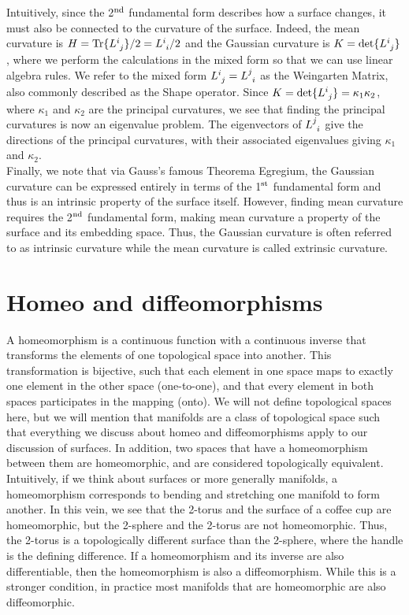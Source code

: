 \begin{appendices}
Intuitively, since the 2$^{\rm nd}$ fundamental form describes how a surface changes, it must also be connected to the curvature of the surface.
Indeed, the mean curvature is $H = \textrm{Tr}\{ \tensor{L}{^i_j} \}/2 = \tensor{L}{^i_i}/2$ and the Gaussian curvature is $K = \textrm{det}\{ \tensor{L}{^i_j} \}$, where we perform the calculations in the mixed form so that we can use linear algebra rules.
We refer to the mixed form  $\tensor{L}{^i_j} = \tensor{L}{^j_i}$ as the Weingarten Matrix, also commonly described as the Shape operator.
Since $K = \textrm{det}\{ \tensor{L}{^i_j} \} = \kappa_1 \kappa_2$, where $\kappa_1$ and $\kappa_2$ are the principal curvatures, we see that finding the principal curvatures is now an eigenvalue problem.
The eigenvectors of $\tensor{L}{^j_i}$ give the directions of the principal curvatures, with their associated eigenvalues giving $\kappa_1$ and $\kappa_2$. \\

Finally, we note that via Gauss's famous Theorema Egregium, the Gaussian curvature can be expressed entirely in terms of the 1$^{\rm st}$ fundamental form and thus is an intrinsic property of the surface itself.
However, finding mean curvature requires the 2$^{\rm nd}$ fundamental form, making mean curvature a property of the surface and its embedding space.
Thus, the Gaussian curvature is often referred to as intrinsic curvature while the mean curvature is called extrinsic curvature.



\section{Homeo and diffeomorphisms}
A homeomorphism is a continuous function with a continuous inverse that transforms the elements of one topological space into another. This transformation is bijective, such that each element in one space maps to exactly one element in the other space (one-to-one), and that every element in both spaces participates in the mapping (onto).
We will not define topological spaces here, but we will mention that manifolds are a class of topological space such that everything we discuss about homeo and diffeomorphisms apply to our discussion of surfaces.
In addition, two spaces that have a homeomorphism between them are homeomorphic, and are considered topologically equivalent. \\

Intuitively, if we think about surfaces or more generally manifolds, a homeomorphism corresponds to bending and stretching one manifold to form another.
In this vein, we see that the 2-torus and the surface of a coffee cup are homeomorphic, but the 2-sphere and the 2-torus are not homeomorphic.
Thus, the 2-torus is a topologically different surface than the 2-sphere, where the handle is the defining difference.
If a homeomorphism and its inverse are also differentiable, then the homeomorphism is also a diffeomorphism.
While this is a stronger condition, in practice most manifolds that are homeomorphic are also diffeomorphic.




\end{appendices}
